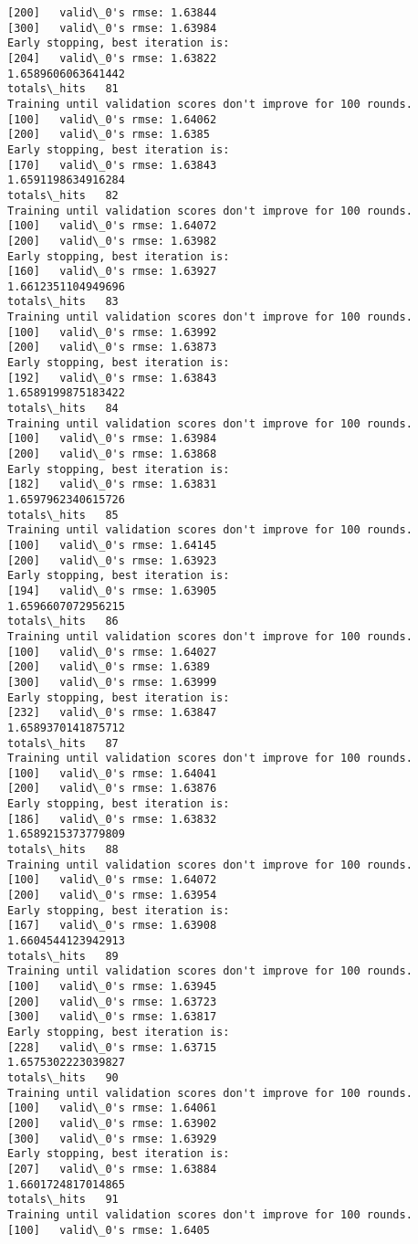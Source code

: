 \documentclass[11pt]{article}
\begin{document}
\begin{Verbatim}[commandchars=\\\{\}]
[200]	valid\_0's rmse: 1.63844
[300]	valid\_0's rmse: 1.63984
Early stopping, best iteration is:
[204]	valid\_0's rmse: 1.63822
1.6589606063641442
totals\_hits   81
Training until validation scores don't improve for 100 rounds.
[100]	valid\_0's rmse: 1.64062
[200]	valid\_0's rmse: 1.6385
Early stopping, best iteration is:
[170]	valid\_0's rmse: 1.63843
1.6591198634916284
totals\_hits   82
Training until validation scores don't improve for 100 rounds.
[100]	valid\_0's rmse: 1.64072
[200]	valid\_0's rmse: 1.63982
Early stopping, best iteration is:
[160]	valid\_0's rmse: 1.63927
1.6612351104949696
totals\_hits   83
Training until validation scores don't improve for 100 rounds.
[100]	valid\_0's rmse: 1.63992
[200]	valid\_0's rmse: 1.63873
Early stopping, best iteration is:
[192]	valid\_0's rmse: 1.63843
1.6589199875183422
totals\_hits   84
Training until validation scores don't improve for 100 rounds.
[100]	valid\_0's rmse: 1.63984
[200]	valid\_0's rmse: 1.63868
Early stopping, best iteration is:
[182]	valid\_0's rmse: 1.63831
1.6597962340615726
totals\_hits   85
Training until validation scores don't improve for 100 rounds.
[100]	valid\_0's rmse: 1.64145
[200]	valid\_0's rmse: 1.63923
Early stopping, best iteration is:
[194]	valid\_0's rmse: 1.63905
1.6596607072956215
totals\_hits   86
Training until validation scores don't improve for 100 rounds.
[100]	valid\_0's rmse: 1.64027
[200]	valid\_0's rmse: 1.6389
[300]	valid\_0's rmse: 1.63999
Early stopping, best iteration is:
[232]	valid\_0's rmse: 1.63847
1.6589370141875712
totals\_hits   87
Training until validation scores don't improve for 100 rounds.
[100]	valid\_0's rmse: 1.64041
[200]	valid\_0's rmse: 1.63876
Early stopping, best iteration is:
[186]	valid\_0's rmse: 1.63832
1.6589215373779809
totals\_hits   88
Training until validation scores don't improve for 100 rounds.
[100]	valid\_0's rmse: 1.64072
[200]	valid\_0's rmse: 1.63954
Early stopping, best iteration is:
[167]	valid\_0's rmse: 1.63908
1.6604544123942913
totals\_hits   89
Training until validation scores don't improve for 100 rounds.
[100]	valid\_0's rmse: 1.63945
[200]	valid\_0's rmse: 1.63723
[300]	valid\_0's rmse: 1.63817
Early stopping, best iteration is:
[228]	valid\_0's rmse: 1.63715
1.6575302223039827
totals\_hits   90
Training until validation scores don't improve for 100 rounds.
[100]	valid\_0's rmse: 1.64061
[200]	valid\_0's rmse: 1.63902
[300]	valid\_0's rmse: 1.63929
Early stopping, best iteration is:
[207]	valid\_0's rmse: 1.63884
1.6601724817014865
totals\_hits   91
Training until validation scores don't improve for 100 rounds.
[100]	valid\_0's rmse: 1.6405

\end{Verbatim}
\end{document}
